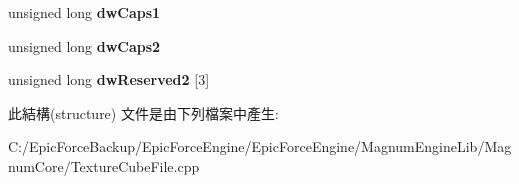 \begin{DoxyCompactItemize}
\item 
unsigned long {\bfseries dw\+Caps1}\hypertarget{struct_d_d_s___h_e_a_d_e_r_a3f8cef4c751f99ae0ab13c41e45fef45}{}\label{struct_d_d_s___h_e_a_d_e_r_a3f8cef4c751f99ae0ab13c41e45fef45}

\item 
unsigned long {\bfseries dw\+Caps2}\hypertarget{struct_d_d_s___h_e_a_d_e_r_a92a49d52ae7b7f700f39e21346f117df}{}\label{struct_d_d_s___h_e_a_d_e_r_a92a49d52ae7b7f700f39e21346f117df}

\item 
unsigned long {\bfseries dw\+Reserved2} \mbox{[}3\mbox{]}\hypertarget{struct_d_d_s___h_e_a_d_e_r_a5766655c9cc16988913a0a7d49df9ebb}{}\label{struct_d_d_s___h_e_a_d_e_r_a5766655c9cc16988913a0a7d49df9ebb}

\end{DoxyCompactItemize}


此結構(structure) 文件是由下列檔案中產生\+:\begin{DoxyCompactItemize}
\item 
C\+:/\+Epic\+Force\+Backup/\+Epic\+Force\+Engine/\+Epic\+Force\+Engine/\+Magnum\+Engine\+Lib/\+Magnum\+Core/Texture\+Cube\+File.\+cpp\end{DoxyCompactItemize}
